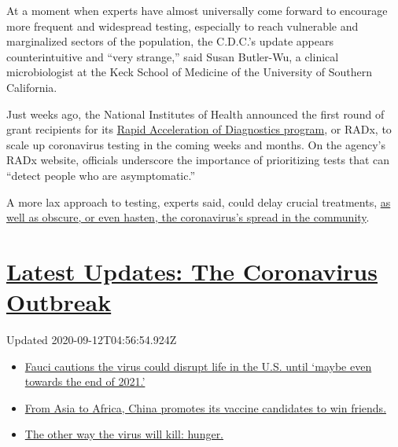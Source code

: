 At a moment when experts have almost universally come forward to
encourage more frequent and widespread testing, especially to reach
vulnerable and marginalized sectors of the population, the C.D.C.'s
update appears counterintuitive and ``very strange,'' said Susan
Butler-Wu, a clinical microbiologist at the Keck School of Medicine of
the University of Southern California.

Just weeks ago, the National Institutes of Health announced the first
round of grant recipients for its
\href{https://www.nih.gov/research-training/medical-research-initiatives/radx}{Rapid
Acceleration of Diagnostics program}, or RADx, to scale up coronavirus
testing in the coming weeks and months. On the agency's RADx website,
officials underscore the importance of prioritizing tests that can
``detect people who are asymptomatic.''

A more lax approach to testing, experts said, could delay crucial
treatments,
\href{https://www.nytimes3xbfgragh.onion/2020/07/19/health/coronavirus-testing-viral-spread.html}{as
well as obscure, or even hasten, the coronavirus's spread in the
community}.

\hypertarget{latest-updates-the-coronavirus-outbreak}{%
\section{\texorpdfstring{\href{https://www.nytimes3xbfgragh.onion/2020/09/11/world/covid-19-coronavirus.html?action=click\&pgtype=Article\&state=default\&region=MAIN_CONTENT_1\&context=storylines_live_updates}{Latest
Updates: The Coronavirus
Outbreak}}{Latest Updates: The Coronavirus Outbreak}}\label{latest-updates-the-coronavirus-outbreak}}

Updated 2020-09-12T04:56:54.924Z

\begin{itemize}
\tightlist
\item
  \href{https://www.nytimes3xbfgragh.onion/2020/09/11/world/covid-19-coronavirus.html?action=click\&pgtype=Article\&state=default\&region=MAIN_CONTENT_1\&context=storylines_live_updates\#link-dfb8a16}{Fauci
  cautions the virus could disrupt life in the U.S. until `maybe even
  towards the end of 2021.'}
\item
  \href{https://www.nytimes3xbfgragh.onion/2020/09/11/world/covid-19-coronavirus.html?action=click\&pgtype=Article\&state=default\&region=MAIN_CONTENT_1\&context=storylines_live_updates\#link-7104d154}{From
  Asia to Africa, China promotes its vaccine candidates to win friends.}
\item
  \href{https://www.nytimes3xbfgragh.onion/2020/09/11/world/covid-19-coronavirus.html?action=click\&pgtype=Article\&state=default\&region=MAIN_CONTENT_1\&context=storylines_live_updates\#link-393ad215}{The
  other way the virus will kill: hunger.}
\end{itemize}

